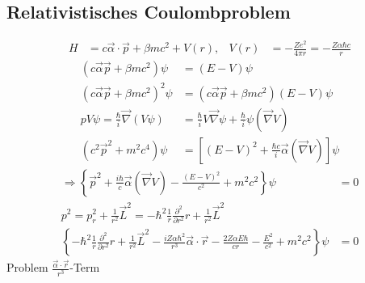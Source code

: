 \subsection{Relativistisches Coulombproblem} 
	\begin{align*}
		H &= c \vec{\alpha} \cdot \vec{p} + \beta m c^2 + V(r) ,&
		V(r) &= -\frac{Z e^2}{4 \pi r} = - \frac{Z \alpha \hbar c}{r} 
	\end{align*}
	\begin{align*}
		(c \vec{\alpha} \vec{p} + \beta m c^2) \psi &= (E-V)\psi \\
		(c \vec{\alpha} \vec{p} + \beta m c^2)^2 \psi &= (c \vec{\alpha} \vec{p} +\beta m c^2)(E-V) \psi \\
		pV \psi = \frac{\hbar}{i} \vec{\nabla} (V \psi) &=
		\frac{\hbar}{i} V \vec{\nabla} \psi + \frac{\hbar}{i} \psi (\vec{\nabla} V)\\
		(c^2 \vec{p}^2 + m^2 c^4) \psi 
		&= \left[(E-V)^2 + \frac{\hbar c}{i} \vec{\alpha} (\vec{\nabla} V)\right] \psi
	\end{align*}
	\begin{align*}
		\Rightarrow \left\{
			\vec{p}^2 + \frac{i\hbar}{c} \vec{\alpha} (\vec{\nabla} V) 
			- \frac{(E-V)^2}{c^2} + m^2c^2
		\right\} \psi &= 0 \\
		p^2 = p_r^2 + \frac{1}{r^2} \vec{L}^2 =
		-\hbar^2 \frac{1}{r} \frac{\partial^2}{\partial r^2} r + \frac{1}{r^2} \vec{L}^2 \\
		\left\{
			-\hbar^2 \frac{1}{r} \frac{\partial^2}{\partial r^2} r +
			\frac{1}{r^2} \vec{L}^2 - \frac{i Z \alpha \hbar^2}{r^3} \vec{\alpha}\cdot \vec{r}
			- \frac{2Z\alpha E \hbar}{cr} - \frac{E^2}{c^2} + m^2c^2
		\right\}  \psi &= 0
	\end{align*}
Problem $\frac{\vec{\alpha} \cdot \vec{r}}{r^3}$-Term 

